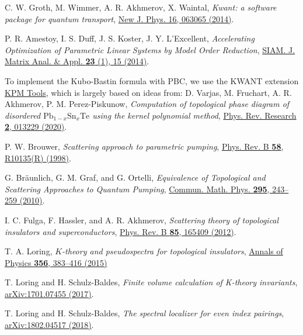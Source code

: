 \documentclass[aps,prl,amsmath,amssymb,twocolumn, superscriptaddress]{revtex4-2}
\begin{document}
\begin{thebibliography}{10}
 C. W. Groth, M. Wimmer, A. R. Akhmerov, X. Waintal, {\em Kwant: a software package for quantum transport}, \href{https://iopscience.iop.org/article/10.1088/1367-2630/16/6/063065}{New J. Phys. 16, 063065 (2014)}.

P. R. Amestoy, I. S. Duff, J. S. Koster, J. Y. L’Excellent, {\em Accelerating Optimization of Parametric Linear Systems by Model Order Reduction}, \href{https://epubs.siam.org/doi/10.1137/120869171}{SIAM. J. Matrix Anal. \& Appl. {\bf 23} (1), 15 (2014)}. 

To implement the Kubo-Bastin formula with PBC, we use the KWANT extension \href{https://kpm-tools.readthedocs.io/en/latest/index.html}{KPM Tools}, which is largely based on ideas from: 
D. Varjas, M. Fruchart, A. R. Akhmerov, P. M. Perez-Piskunow, {\em Computation of topological phase diagram of disordered $\mathrm{Pb}_{1-x} \mathrm{Sn}_x \mathrm{Te}$ using the kernel polynomial method}, \href{https://journals.aps.org/prresearch/abstract/10.1103/PhysRevResearch.2.013229}{Phys. Rev. Research {\bf 2}, 013229 (2020)}. 

P. W. Brouwer, {\em Scattering approach to parametric pumping}, \href{https://journals.aps.org/prb/abstract/10.1103/PhysRevB.58.R10135}{Phys. Rev. B {\bfseries 58}, R10135(R) (1998)}.

G. Bräunlich, G. M. Graf, and G. Ortelli, {\em Equivalence of Topological and Scattering Approaches to Quantum Pumping}, \href{https://link.springer.com/article/10.1007/s00220-009-0983-1}{ Commun. Math. Phys. {\bfseries 295}, 243–259 (2010)}.

I. C. Fulga, F. Hassler, and A. R. Akhmerov, {\em Scattering theory of topological insulators and superconductors}, \href{https://journals.aps.org/prb/abstract/10.1103/PhysRevB.85.165409}{Phys. Rev. B {\bfseries 85}, 165409 (2012)}.


T. A. Loring, {\em $K$-theory and pseudospectra for topological insulators}, \href{https://www.sciencedirect.com/science/article/abs/pii/S0003491615000901}{Annals of Physics {\bfseries 356}, 383–416 (2015)}

T. Loring and H. Schulz-Baldes, {\em Finite volume calculation of K-theory invariants}, \href{https://arxiv.org/abs/1701.07455}{arXiv:1701.07455 (2017)}.

T. Loring and H. Schulz-Baldes, {\em The spectral localizer for even index pairings}, \href{https://arxiv.org/abs/1802.04517}{arXiv:1802.04517 (2018)}.


\end{thebibliography}
\end{document}
